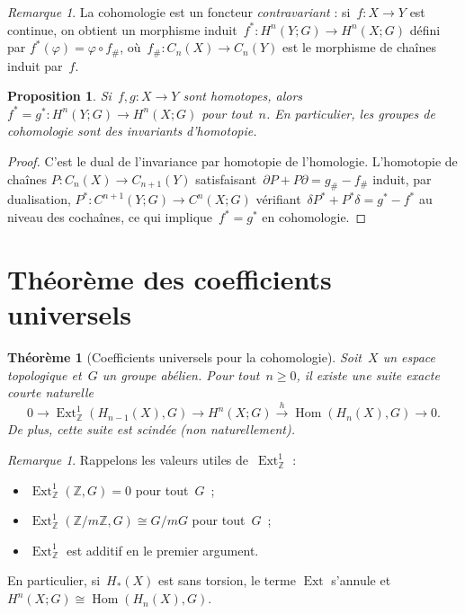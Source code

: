 \documentclass[12pt,a4paper,openany]{book}
\theoremstyle{definition}
\theoremstyle{plain}
\newtheorem{theoreme}[definition]{Théorème}
\newtheorem{proposition}[definition]{Proposition}
\theoremstyle{remark}
\newtheorem{remarque}[definition]{Remarque}
\newcommand{\Z}{\mathbb{Z}}
\DeclareMathOperator{\Hom}{Hom}
\begin{document}
\begin{remarque}\label{rem:cohomologie-fonctorialite}
La cohomologie est un foncteur \emph{contravariant} : si~$f \colon X \to Y$ est continue,
on obtient un morphisme induit~$f^* \colon H^n(Y; G) \to H^n(X; G)$ défini par
$f^*(\varphi) = \varphi \circ f_\#$, où~$f_\# \colon C_n(X) \to C_n(Y)$ est le
morphisme de chaînes induit par~$f$.
\end{remarque}

\begin{proposition}\label{prop:cohomologie-homotopie}
Si~$f, g \colon X \to Y$ sont homotopes, alors~$f^* = g^* \colon H^n(Y; G) \to H^n(X; G)$
pour tout~$n$. En particulier, les groupes de cohomologie sont des invariants d'homotopie.
\end{proposition}

\begin{proof}
C'est le dual de l'invariance par homotopie de l'homologie. L'homotopie de chaînes
$P \colon C_n(X) \to C_{n+1}(Y)$ satisfaisant~$\partial P + P \partial = g_\# - f_\#$
induit, par dualisation,
$P^* \colon C^{n+1}(Y; G) \to C^n(X; G)$ vérifiant~$\delta P^* + P^* \delta = g^* - f^*$
au niveau des cochaînes, ce qui implique~$f^* = g^*$ en cohomologie.
\end{proof}

\section{Théorème des coefficients universels}\label{sec:coefficients-universels}

\begin{theoreme}[Coefficients universels pour la cohomologie]\label{thm:coeff-universels}
Soit~$X$ un espace topologique et~$G$ un groupe abélien. Pour tout~$n \geqslant 0$,
il existe une suite exacte courte naturelle
\[
  0 \longrightarrow \operatorname{Ext}^1_\Z(H_{n-1}(X), G)
  \longrightarrow H^n(X; G)
  \xrightarrow{\;h\;}
  \Hom(H_n(X), G) \longrightarrow 0.
\]
De plus, cette suite est scindée (non naturellement).
\end{theoreme}


\begin{remarque}\label{rem:ext-calcul}
Rappelons les valeurs utiles de~$\operatorname{Ext}^1_\Z$ :
\begin{itemize}
  \item $\operatorname{Ext}^1_\Z(\Z, G) = 0$ pour tout~$G$~;
  \item $\operatorname{Ext}^1_\Z(\Z/m\Z, G) \cong G/mG$ pour tout~$G$~;
  \item $\operatorname{Ext}^1_\Z$ est additif en le premier argument.
\end{itemize}
En particulier, si~$H_*(X)$ est sans torsion, le terme $\operatorname{Ext}$ s'annule
et~$H^n(X; G) \cong \Hom(H_n(X), G)$.
\end{remarque}
\end{document}
